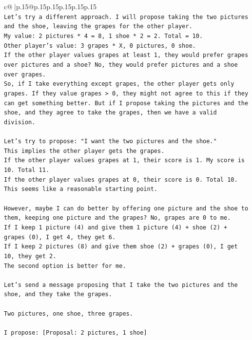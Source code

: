 \documentclass{article}
\begin{document}
{\begin{supertabular}{c@{$\;$}|p{.15\linewidth}@{}p{.15\linewidth}p{.15\linewidth}p{.15\linewidth}p{.15\linewidth}p{.15\linewidth}}
{{{\\ 
\texttt{Let's try a different approach. I will propose taking the two pictures and the shoe, leaving the grapes for the other player.} \\
\texttt{My value: 2 pictures * 4 = 8, 1 shoe * 2 = 2. Total = 10.} \\
\texttt{Other player's value: 3 grapes * X, 0 pictures, 0 shoe.} \\
\texttt{If the other player values grapes at least 1, they would prefer grapes over pictures and a shoe? No, they would prefer pictures and a shoe over grapes.} \\
\texttt{So, if I take everything except grapes, the other player gets only grapes. If they value grapes > 0, they might not agree to this if they can get something better. But if I propose taking the pictures and the shoe, and they agree to take the grapes, then we have a valid division.} \\
\\ 
\texttt{Let's try to propose: "I want the two pictures and the shoe."} \\
\texttt{This implies the other player gets the grapes.} \\
\texttt{If the other player values grapes at 1, their score is 1. My score is 10. Total 11.} \\
\texttt{If the other player values grapes at 0, their score is 0. Total 10.} \\
\texttt{This seems like a reasonable starting point.} \\
\\ 
\texttt{However, maybe I can do better by offering one picture and the shoe to them, keeping one picture and the grapes? No, grapes are 0 to me.} \\
\texttt{If I keep 1 picture (4) and give them 1 picture (4) + shoe (2) + grapes (0), I get 4, they get 6.} \\
\texttt{If I keep 2 pictures (8) and give them shoe (2) + grapes (0), I get 10, they get 2.} \\
\texttt{The second option is better for me.} \\
\\ 
\texttt{Let's send a message proposing that I take the two pictures and the shoe, and they take the grapes.} \\
\\ 
\texttt{Two pictures, one shoe, three grapes.} \\
\\ 
\texttt{I propose: {[}Proposal: 2 pictures, 1 shoe{]}} \\
}}}
\end{supertabular}}
\end{document}
